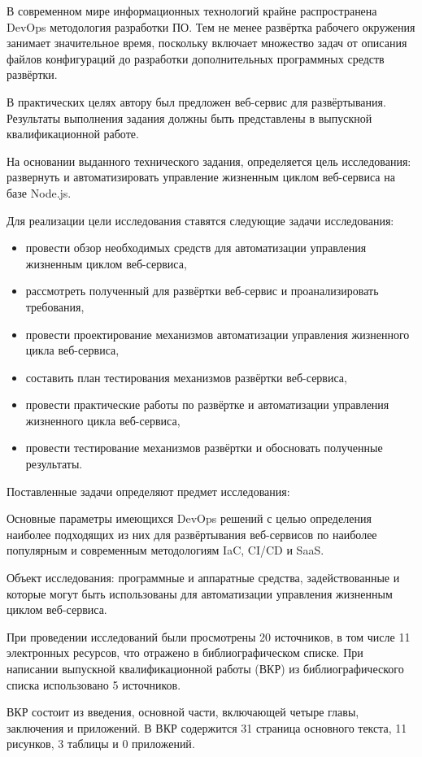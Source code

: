 \Introduction

В современном мире информационных технологий крайне распространена DevOps методология разработки ПО\cite{projectPhoenix}.
Тем не менее развёртка рабочего окружения занимает значительное время, поскольку включает множество задач от
описания файлов конфигураций до разработки дополнительных программных средств развёртки.

В практических целях автору был предложен веб-сервис для развёртывания.
Результаты выполнения задания должны быть представлены в выпускной квалификационной работе.

На основании выданного технического задания, определяется цель исследования: развернуть и автоматизировать управление жизненным циклом веб-сервиса на базе Node.js.

Для реализации цели исследования ставятся следующие задачи исследования:

\begin{itemize}
    \item провести обзор необходимых средств для автоматизации управления жизненным циклом веб-сервиса,
    \item рассмотреть полученный для развёртки веб-сервис и проанализировать требования,
    \item провести проектирование механизмов автоматизации управления жизненного цикла веб-сервиса,
    \item составить план тестирования механизмов развёртки веб-сервиса,
    \item провести практические работы по развёртке и автоматизации управления жизненного цикла веб-сервиса,
    \item провести тестирование механизмов развёртки и обосновать полученные результаты.
\end{itemize}

Поставленные задачи определяют предмет исследования:

Основные параметры имеющихся DevOps решений с целью определения наиболее подходящих из них для развёртывания веб-сервисов
по наиболее популярным и современным методологиям IaC, CI/CD и SaaS.

Объект исследования: программные и аппаратные средства, задействованные и которые могут быть использованы для автоматизации управления жизненным циклом веб-сервиса.

При проведении исследований были просмотрены 20 источников, в том числе 11 электронных ресурсов, что отражено в библиографическом списке.
При написании выпускной квалификационной работы (ВКР) из библиографического списка использовано 5 источников.

ВКР состоит из введения, основной части, включающей четыре главы, заключения и приложений.
В ВКР содержится 31 страница основного текста, 11 рисунков, 3 таблицы и 0 приложений\cite{vkrsen}.